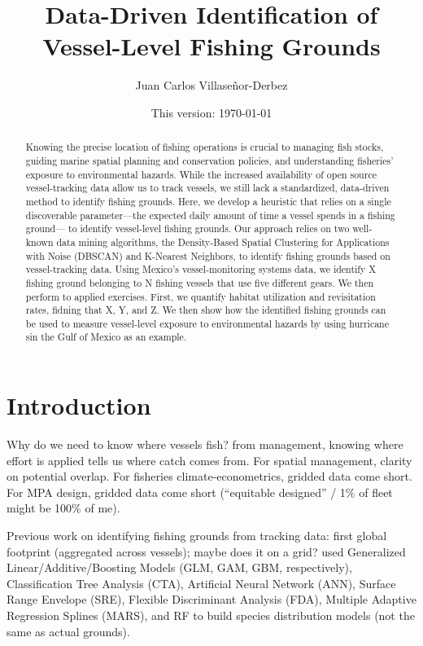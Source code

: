 \documentclass[12pt]{article}
\title{\textbf{Data-Driven Identification of Vessel-Level Fishing Grounds}}
\author[1,2]{\normalsize Juan Carlos Villaseñor-Derbez}
\affil[1]{Rosenstiel School of Marine, Atmospheric \& Earth Sciences, University of Miami}
\affil[2]{Institute for Data Science \& Computing, University of Miami}
\date{This version: \today}
\begin{document}
\begin{singlespace}
    \maketitle

    \begin{abstract}
        Knowing the precise location of fishing operations is crucial to managing fish stocks, guiding marine spatial planning and conservation policies, and understanding fisheries' exposure to environmental hazards. While the increased availability of open source vessel-tracking data allow us to track vessels, we still lack a standardized, data-driven method to identify fishing grounds. Here, we develop a heuristic that relies on a single discoverable parameter---the expected daily amount of time a vessel spends in a fishing ground--- to identify vessel-level fishing grounds. Our approach relies on two well-known data mining algorithms, the Density-Based Spatial Clustering for Applications with Noise (DBSCAN) and K-Nearest Neighbors, to identify fishing grounds based on vessel-tracking data. Using Mexico's vessel-monitoring systems data, we identify X fishing ground belonging to N fishing vessels that use five different gears. We then perform to applied exercises. First, we quantify habitat utilization and revisitation rates, fidning that X, Y, and Z. We then show how the identified fishing grounds can be used to measure vessel-level exposure to environmental hazards by using hurricane sin the Gulf of Mexico as an example.
    \end{abstract}
\end{singlespace}

\clearpage

\FloatBarrier
\section{Introduction}

Why do we need to know where vessels fish? from management, knowing where effort is applied tells us where catch comes from. For spatial management, clarity on potential overlap. For fisheries climate-econometrics, gridded data come short. For MPA design, gridded data come short (``equitable designed'' / 1\% of fleet might be 100\% of me). \citep{Orofino2023-op, Raynor2026-ud}

Previous work on identifying fishing grounds from tracking data: \citet{Kroodsma2018-xq} first global footprint (aggregated across vessels); \citep{Jennings2012-tp} maybe does it on a grid? \citep{Torres-Irineo2021-pq} used Generalized Linear/Additive/Boosting Models (GLM, GAM, GBM, respectively), Classification Tree Analysis (CTA), Artificial Neural Network (ANN), Surface Range Envelope (SRE), Flexible Discriminant Analysis (FDA), Multiple Adaptive Regression Splines (MARS), and RF to build species distribution models (not the same as actual grounds).
\end{document}
